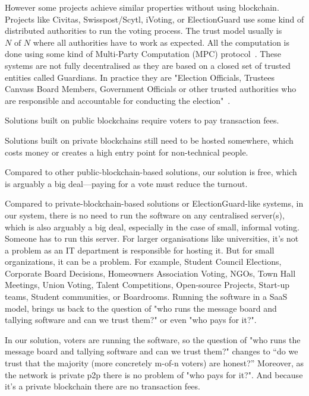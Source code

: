 \documentclass{article}
\begin{document}
However some projects achieve similar properties without using blockchain. Projects like Civitas, Swisspost/Scytl, iVoting, or ElectionGuard use some kind of distributed authorities to run the voting process. The trust model usually is $N \textrm{ of } N$ where all authorities have to work as expected. All the computation is done using some kind of Multi-Party Computation (MPC) protocol~\cite{boweMultipartyProtocolConstructing2018}.
These systems are not fully decentralised as they are based on a closed set of trusted entities called Guardians. In practice they are "Election Officials, Trustees Canvass Board Members, Government Officials or other trusted authorities who are responsible and accountable for conducting the election"~\cite{ElectionGuardWhoGuardian}.


Solutions built on public blockchains require voters to pay transaction fees.

Solutions built on private blockchains still need to be hosted somewhere, which costs money or creates a high entry point for non-technical people.

Compared to other public-blockchain-based solutions, our solution is free, which is arguably a big deal—paying for a vote must reduce the turnout.

Compared to private-blockchain-based solutions or ElectionGuard-like systems, in our system, there is no need to run the software on any centralised server(s), which is also arguably a big deal, especially in the case of small, informal voting. Someone has to run this server. For larger organisations like universities, it's not a problem as an IT department is responsible for hosting it. But for small organizations, it can be a problem. For example, Student Council Elections, Corporate Board Decisions, Homeowners Association Voting, NGOs, Town Hall Meetings, Union Voting, Talent Competitions, Open-source Projects, Start-up teams, Student communities, or Boardrooms. Running the software in a SaaS model, brings us back to the question of "who runs the message board and tallying software and can we trust them?" or even "who pays for it?".

In our solution, voters are running the software, so the question of "who runs the message board and tallying software and can we trust them?" changes to “do we trust that the majority (more concretely m-of-n voters) are honest?” Moreover, as the network is private p2p there is no problem of "who pays for it?". And because it's a private blockchain there are no transaction fees.
\end{document}
